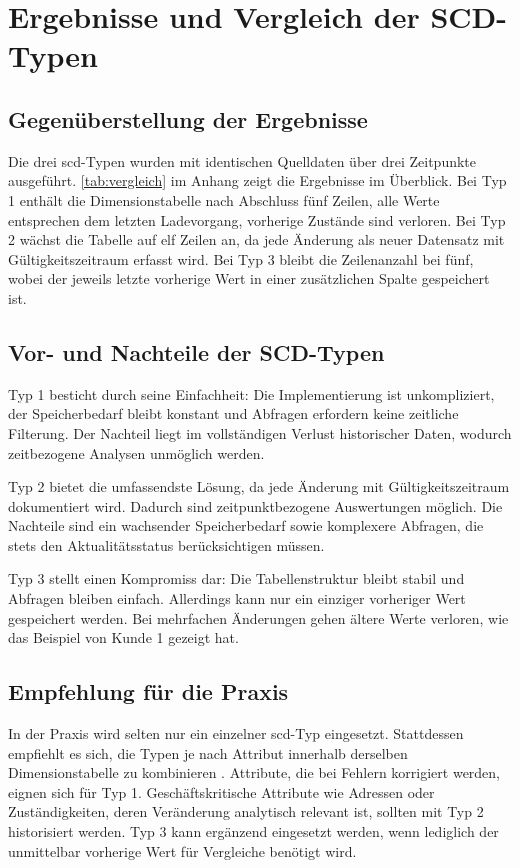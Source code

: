 \documentclass[a4paper,11pt]{article}
\begin{document}
\section{Ergebnisse und Vergleich der SCD-Typen}

\subsection{Gegenüberstellung der Ergebnisse}
Die drei \gls{scd}-Typen wurden mit identischen Quelldaten über drei Zeitpunkte ausgeführt. \cref{tab:vergleich} im 
Anhang zeigt die Ergebnisse im Überblick. Bei Typ 1 enthält die Dimensionstabelle nach Abschluss fünf Zeilen, 
alle Werte entsprechen dem letzten Ladevorgang, vorherige Zustände sind verloren. Bei Typ 2 wächst die Tabelle auf 
elf Zeilen an, da jede Änderung als neuer Datensatz mit Gültigkeitszeitraum erfasst wird. Bei Typ 3 bleibt die 
Zeilenanzahl bei fünf, wobei der jeweils letzte vorherige Wert in einer zusätzlichen Spalte gespeichert ist.

\subsection{Vor- und Nachteile der SCD-Typen}
Typ 1 besticht durch seine Einfachheit: Die Implementierung ist unkompliziert, der Speicherbedarf bleibt 
konstant und Abfragen erfordern keine zeitliche Filterung. Der Nachteil liegt im vollständigen Verlust 
historischer Daten, wodurch zeitbezogene Analysen unmöglich werden.

Typ 2 bietet die umfassendste Lösung, da jede Änderung mit Gültigkeitszeitraum dokumentiert wird. Dadurch 
sind zeitpunktbezogene Auswertungen möglich. Die Nachteile sind ein wachsender Speicherbedarf sowie komplexere 
Abfragen, die stets den Aktualitätsstatus berücksichtigen müssen.

Typ 3 stellt einen Kompromiss dar: Die Tabellenstruktur bleibt stabil und Abfragen bleiben einfach. Allerdings 
kann nur ein einziger vorheriger Wert gespeichert werden. Bei mehrfachen Änderungen gehen ältere Werte verloren, 
wie das Beispiel von Kunde 1 gezeigt hat.

\subsection{Empfehlung für die Praxis}
In der Praxis wird selten nur ein einzelner \gls{scd}-Typ eingesetzt. Stattdessen empfiehlt es sich, die 
Typen je nach Attribut innerhalb derselben Dimensionstabelle zu kombinieren \parencite[S.~183]{linstedt2015data}. 
Attribute, die bei Fehlern korrigiert werden, eignen sich für Typ 1. Geschäftskritische Attribute wie Adressen 
oder Zuständigkeiten, deren Veränderung analytisch relevant ist, sollten mit Typ 2 historisiert werden. Typ 3 
kann ergänzend eingesetzt werden, wenn lediglich der unmittelbar vorherige Wert für Vergleiche benötigt wird.
\end{document}
